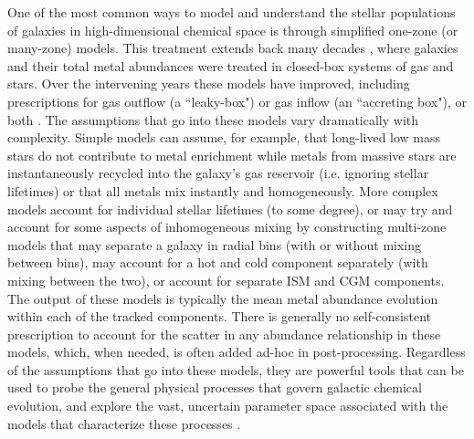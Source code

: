 One of the most common ways to model and understand the stellar populations of galaxies in high-dimensional chemical space is through simplified one-zone (or many-zone) models. This treatment extends back many decades \citep[e.g.][]{Schmidt1963,TalbotArnett1971,Lynden-Bell1975}, where galaxies and their total metal abundances were treated in closed-box systems of gas and stars. Over the intervening years these models have improved, including prescriptions for gas outflow (a ``leaky-box") or gas inflow (an ``accreting box"), or both \citep[a ``bathtub" model, e.g.][]{FinlatorDave2008,Bouche2010}. The assumptions that go into these models vary dramatically with complexity. Simple models can assume, for example, that long-lived low mass stars do not contribute to metal enrichment while metals from massive stars are instantaneously recycled into the galaxy's gas reservoir (i.e. ignoring stellar lifetimes) or that all metals mix instantly and homogeneously. More complex models account for individual stellar lifetimes (to some degree), or may try and account for some aspects of inhomogeneous mixing by constructing multi-zone models that may separate a galaxy in radial bins (with or without mixing between bins), may account for a hot and cold component separately (with mixing between the two), or account for separate ISM and CGM components. The output of these models is typically the mean metal abundance evolution within each of the tracked components. There is generally no self-consistent prescription to account for the scatter in any abundance relationship in these models, which, when needed, is often added ad-hoc in post-processing. Regardless of the assumptions that go into these models, they are powerful tools that can be used to probe the general physical processes that govern galactic chemical evolution, and explore the vast, uncertain parameter space associated with the models that characterize these processes \citep[e.g.][]{Cote2017a}.

